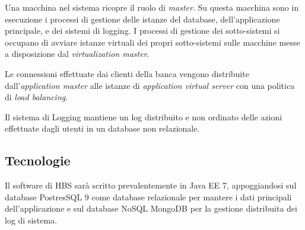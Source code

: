 Una macchina nel sistema ricopre il ruolo di \emph{master}.
Su questa macchina sono in esecuzione i processi di gestione delle istanze del database, dell'applicazione principale, e dei sistemi di logging.
I processi di gestione dei sotto-sistemi si occupano di avviare istanze virtuali dei propri sotto-sistemi sulle macchine messe a disposizione dal \emph{virtualization master}.

Le connessioni effettuate dai clienti della banca vengono distribuite dall'\emph{application master} alle istanze di \emph{application virtual server} con una politica di \emph{load balancing}.

Il sistema di Logging mantiene un log distribuito e non ordinato delle azioni effettuate dagli utenti in un database non relazionale.

\subsection{Tecnologie}

Il software di HBS sar\`a scritto prevalentemente in Java EE 7, appoggiandosi sul database PostresSQL 9 come database relazionale per mantere i dati principali dell'applicazione e sul database NoSQL MongoDB per la gestione distribuita dei log di sistema.

